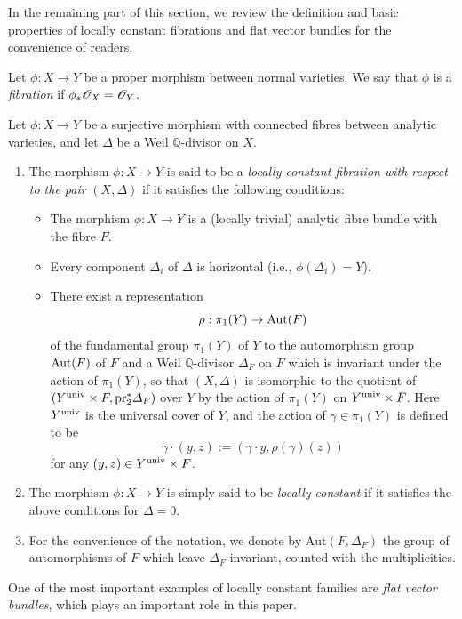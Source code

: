 In the remaining part of this section, we review the definition and basic properties of locally constant fibrations and flat vector bundles for the convenience of readers.

Let $\phi:X\rightarrow Y$ be a proper morphism between normal varieties. We say that $\phi$ is a \emph{fibration} if $\phi_*\scrO_X=\scrO_Y$. 
\begin{defn}\label{defn-locally-constant}
Let $\phi:X\to Y$ be a surjective morphism with connected fibres between analytic varieties, and let $\Delta$ be a Weil $\mathbb{Q}$-divisor on $X$.
\begin{enumerate}
	\item[(1)] The morphism $\phi:X\to Y$ is said to be a \textit{locally constant fibration with respect to the pair} $(X,\Delta)$ if it satisfies the following conditions:
	\begin{itemize}
	\item The morphism $\phi:X\to Y$  is a (locally trivial) analytic fibre bundle with the fibre $F$.
	\item Every component $\Delta_i$ of $\Delta$ is horizontal (i.e., $\phi(\Delta_i)=Y$).
	\item There exist a representation
	$$\rho:\pi_1(Y)\to \textup{Aut}(F)$$
	of the fundamental group $\pi_1(Y)$ of $Y$ to the automorphism group $\Aut(F)$ of $F$ and a Weil $\mathbb{Q}$-divisor $\Delta_F$ on $F$ which is invariant under the action of $\pi_1(Y)$, so that $(X,\Delta)$ is isomorphic to the quotient of $(Y^{\text{univ}}\times F, \textup{pr}_2^*\Delta_F)$ over $Y$ by the action of $\pi_1(Y)$ on $Y^{\textup{univ}}\times F$.
	Here $Y^{\textup{univ}}$ is the universal cover of $Y$, and the action of $\gamma\in\pi_1(Y)$ is defined to be
	$$\gamma\cdot(y,z):=(\gamma\cdot y,\rho(\gamma)(z))$$
	for any $(y,z)\in Y^{\textup{univ}}\times F$.
	\end{itemize}
 \item[(2)] The morphism $\phi:X\to Y$ is simply said to be \textit{locally constant} if it satisfies the above conditions for $\Delta=0$.
 \item[(3)] For the convenience of the notation, we denote by $\text{Aut}(F,\Delta_F)$  the group of  automorphisms of $F$ which leave  $\Delta_F$ invariant, counted with the multiplicities.
\end{enumerate}
\end{defn}




One of the most important examples of locally constant families  are   \emph{flat vector bundles}, which plays an important role in this paper.

